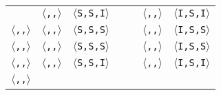 \begin{tabular}{|c|c|c|c|c|c|c|}
& \texttt{$\langle$\benchx{},\benchs{},\benchi{}$\rangle$}
& \texttt{$\langle$S,S,I$\rangle$}

&
&

& \texttt{$\langle$\benchi{},\benchs{},\benchi{}$\rangle$}
& \texttt{$\langle$I,S,I$\rangle$}
\\
\cline{1-3}
\cline{6-7}

\texttt{$\langle$\benchx{},\benchx{},\benchs{}$\rangle$}

& \texttt{$\langle$\benchx{},\benchx{},\benchs{}$\rangle$}
& \texttt{$\langle$S,S,S$\rangle$}

&
&

& \texttt{$\langle$\benchi{},\benchx{},\benchs{}$\rangle$}
& \texttt{$\langle$I,S,S$\rangle$}
\\
\cline{1-3}
\cline{6-7}

\texttt{$\langle$\benchs{},\benchx{},\benchx{}$\rangle$}

& \texttt{$\langle$\benchs{},\benchx{},\benchx{}$\rangle$}
& \texttt{$\langle$S,S,S$\rangle$}

&
&

& \texttt{$\langle$\benchi{},\benchx{},\benchx{}$\rangle$}
& \texttt{$\langle$I,S,S$\rangle$}
\\
\cline{1-3}
\cline{6-7}

\texttt{$\langle$\benchs{},\benchx{},\benchi{}$\rangle$}

& \texttt{$\langle$\benchs{},\benchx{},\benchi{}$\rangle$}
& \texttt{$\langle$S,S,I$\rangle$}

&
&

& \texttt{$\langle$\benchi{},\benchx{},\benchi{}$\rangle$}
& \texttt{$\langle$I,S,I$\rangle$}
\\
\cline{1-3}
\cline{6-7}

\texttt{$\langle$\benchi{},\benchi{},\benchs{}$\rangle$}


\end{tabular}
